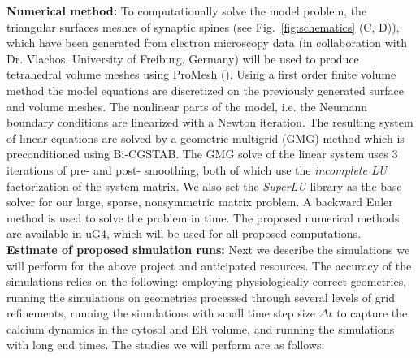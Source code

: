 \noindent\textbf{Numerical method:} To computationally solve the model problem, the triangular surfaces meshes of synaptic spines (see Fig.~\ref{fig:schematics} (C, D)), which have been generated from electron microscopy data (in collaboration with Dr. Vlachos, University of Freiburg, Germany) will be used to produce tetrahedral volume meshes using ProMesh (\cite{Reiter2012}). Using a first order finite volume method \cite{Eymard2000} the model equations are discretized on the previously generated surface and volume meshes. The nonlinear parts of the model, i.e. the Neumann boundary conditions are linearized with a Newton iteration. The resulting system of linear equations are solved by a geometric multigrid (GMG) method which is preconditioned using Bi-CGSTAB.  The GMG solve of the linear system uses 3 iterations of pre- and post- smoothing, both of which use the \textit{incomplete LU} factorization of the system matrix. We also set the \textit{SuperLU} library as the base solver for our large, sparse, nonsymmetric matrix problem. A backward Euler method is used to solve the problem in time. The proposed numerical methods are available in uG4, which will be used for all proposed computations. \\
\noindent \textbf{Estimate of proposed simulation runs:}
Next we describe the simulations we will perform for the above project and anticipated resources. The accuracy of the simulations relies on the following: employing physiologically correct geometries, running the simulations on geometries processed through several levels of grid refinements, running the simulations with small time step size $\Delta t$ to capture the calcium dynamics in the cytosol and ER volume, and running the simulations with long end times. The studies we will perform are as follows:
